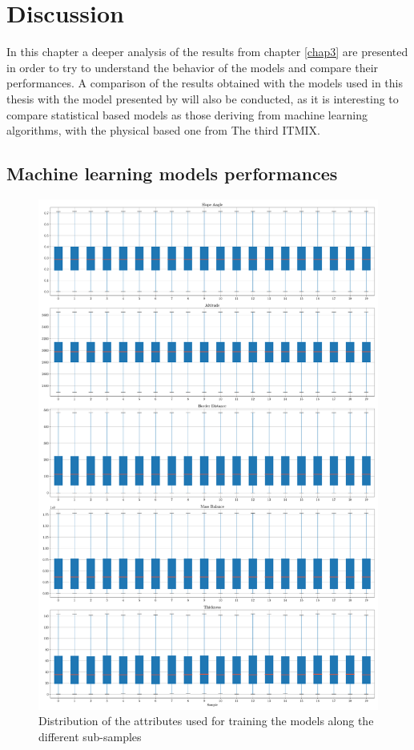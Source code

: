 \chapter{Discussion}\label{disc}
\thispagestyle{plain}
In this chapter a deeper analysis of the results from chapter \ref{chap3} are presented in order to try to understand the behavior of the models and compare their performances. A comparison of the results obtained with the models used in this thesis with the model presented by \cite{Farinotti2019} will also be conducted, as it is interesting to compare statistical based models as those deriving from machine learning algorithms, with the physical based one from  The third ITMIX.

\section{Machine learning models performances}\label{MLcomp}

\begin{figure}[p]
	\centering		  
	\includegraphics[width=1.\textwidth]{figures/samples_distribution.pdf}
	\caption{Distribution of the attributes used for training the models along the different sub-samples}
	\label{fig:distribution}
\end{figure}

